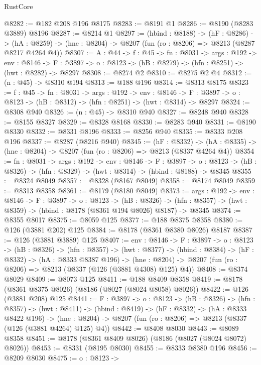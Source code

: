 \begin{lexlean}{RustCore}
\begin{coremodule}
@8282 := @182 @208 @196 @8175
@8283 := @8191 @1
@8286 := @8190 (@8283 @3889) @8196
@8287 := @8214 @1
@8297 := (hbind : @8188) ->
  (hF : @8286) ->
  (hA : @8259) -> (hne : @8204) -> @8207 (fun (ro : @8206) => @8213 (@8287 @8217 @4264 @4))
@8307 := {A : @44} ->
  {f : @45} ->
  {fn : @8031} ->
  {args : @192} ->
  {env : @8146} ->
  {F : @3897} -> {o : @8123} -> (hB : @8279) -> (hfn : @8251) -> (hwt : @8282) -> @8297
@8308 := @8274 @2
@8310 := @8275 @2 @4
@8312 := (n : @45) -> @8310 @194
@8313 := @188 @196
@8314 := @8313 @8175
@8323 := {f : @45} ->
  {fn : @8031} ->
  {args : @192} ->
  {env : @8146} ->
  {F : @3897} -> {o : @8123} -> (hB : @8312) -> (hfn : @8251) -> (hwt : @8314) -> @8297
@8324 := @8308 @940
@8326 := (n : @45) -> @8310 @940
@8327 := @8248 @940
@8328 := @8155 @8327
@8329 := @8328 @8168
@8330 := @8283 @940
@8331 := @8190 @8330
@8332 := @8331 @8196
@8333 := @8256 @940
@8335 := @8333 @208 @196
@8337 := @8287 (@8216 @940)
@8345 := (hF : @8332) ->
  (hA : @8335) -> (hne : @8204) -> @8207 (fun (ro : @8206) => @8213 (@8337 @4264 @4))
@8354 := {fn : @8031} ->
  {args : @192} ->
  {env : @8146} ->
  {F : @3897} ->
  {o : @8123} -> (hB : @8326) -> (hfn : @8329) -> (hwt : @8314) -> (hbind : @8188) -> @8345
@8355 := @8324 @8049
@8357 := @8328 (@8167 @8049)
@8358 := @8174 @8049
@8359 := @8313 @8358
@8361 := @8179 (@8180 @8049)
@8373 := {args : @192} ->
  {env : @8146} ->
  {F : @3897} ->
  {o : @8123} ->
  (hB : @8326) ->
  (hfn : @8357) -> (hwt : @8359) -> (hbind : @8178 (@8361 @194 @8026) @8187) -> @8345
@8374 := @8355 @8017
@8375 := @8059 @125
@8377 := @188 @8375 @8358
@8380 := @126 (@3881 @202) @125
@8384 := @8178 (@8361 @8380 @8026) @8187
@8387 := @126 (@3881 @3889) @125
@8407 := {env : @8146} ->
  {F : @3897} ->
  {o : @8123} ->
  (hB : @8326) ->
  (hfn : @8357) ->
  (hwt : @8377) ->
  (hbind : @8384) ->
  (hF : @8332) ->
  (hA : @8333 @8387 @196) ->
  (hne : @8204) -> @8207 (fun (ro : @8206) => @8213 (@8337 (@126 (@3881 @4308) @125) @4))
@8408 := @8374 @8029
@8409 := @8073 @125
@8411 := @188 @8409 @8358
@8419 := @8178 (@8361 @8375 @8026) (@8186 (@8027 (@8024 @8058) @8026))
@8422 := @126 (@3881 @208) @125
@8441 := {F : @3897} ->
  {o : @8123} ->
  (hB : @8326) ->
  (hfn : @8357) ->
  (hwt : @8411) ->
  (hbind : @8419) ->
  (hF : @8332) ->
  (hA : @8333 @8422 @196) ->
  (hne : @8204) -> @8207 (fun (ro : @8206) => @8213 (@8337 (@126 (@3881 @4264) @125) @4))
@8442 := @8408 @8030
@8443 := @8089 @8358
@8451 := @8178 (@8361 @8409 @8026) (@8186 (@8027 (@8024 @8072) @8026))
@8453 := @8331 (@8195 @8030)
@8455 := @8333 @8380 @196
@8456 := @8209 @8030
@8475 := {o : @8123} ->

\end{coremodule}
\end{lexlean}
